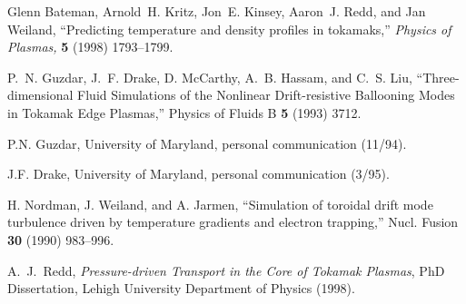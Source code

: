 \begin{thebibliography}{99}

Glenn Bateman, Arnold~H. Kritz, Jon~E. Kinsey, Aaron~J. Redd, and Jan Weiland,
``Predicting temperature and density profiles in tokamaks,''
{\em Physics of Plasmas,} {\bf 5} (1998) 1793--1799.

P.~N. Guzdar, J.~F. Drake, D. McCarthy, A.~B. Hassam, and C.~S. Liu,
``Three-dimensional Fluid Simulations of the Nonlinear Drift-resistive
Ballooning Modes in Tokamak Edge Plasmas,'' Physics of Fluids B {\bf 5}
(1993) 3712.

 P.N. Guzdar, University of Maryland, personal communication
 (11/94).


 J.F. Drake, University of Maryland, personal
communication (3/95).


 H. Nordman, J. Weiland, and A. Jarmen, 
``Simulation of toroidal drift mode turbulence driven by 
temperature gradients and electron trapping,'' 
Nucl. Fusion {\bf 30} (1990) 983--996.



 A.~J.~Redd,
{\it Pressure-driven Transport in the Core of Tokamak Plasmas},
PhD Dissertation, Lehigh University Department of Physics (1998).

\end{thebibliography}

